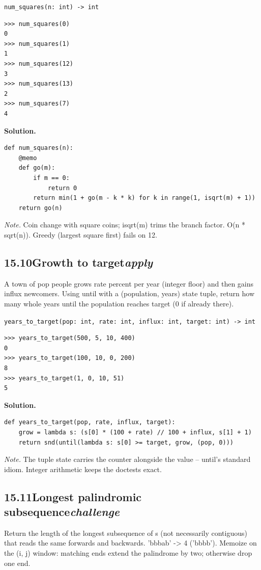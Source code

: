 \documentclass[10pt,letterpaper]{book}
\begin{document}
\noindent\texttt{num\_squares(n: int) -> int}
\begin{lstlisting}[style=ex]
>>> num_squares(0)
0
>>> num_squares(1)
1
>>> num_squares(12)
3
>>> num_squares(13)
2
>>> num_squares(7)
4
\end{lstlisting}
\noindent\textbf{Solution.}
\begin{lstlisting}[style=code]
def num_squares(n):
    @memo
    def go(m):
        if m == 0:
            return 0
        return min(1 + go(m - k * k) for k in range(1, isqrt(m) + 1))
    return go(n)
\end{lstlisting}
\noindent\textit{Note.} Coin change with square coins; isqrt(m) trims the branch factor. O(n * sqrt(n)). Greedy (largest square first) fails on 12.

\subsection*{15.10\quad Growth to target\hfill\textnormal{\textit{apply}}}
A town of pop people grows rate percent per year (integer floor) and then gains influx newcomers. Using until with a (population, years) state tuple, return how many whole years until the population reaches target (0 if already there).

\noindent\texttt{years\_to\_target(pop: int, rate: int, influx: int, target: int) -> int}
\begin{lstlisting}[style=ex]
>>> years_to_target(500, 5, 10, 400)
0
>>> years_to_target(100, 10, 0, 200)
8
>>> years_to_target(1, 0, 10, 51)
5
\end{lstlisting}
\noindent\textbf{Solution.}
\begin{lstlisting}[style=code]
def years_to_target(pop, rate, influx, target):
    grow = lambda s: (s[0] * (100 + rate) // 100 + influx, s[1] + 1)
    return snd(until(lambda s: s[0] >= target, grow, (pop, 0)))
\end{lstlisting}
\noindent\textit{Note.} The tuple state carries the counter alongside the value -- until's standard idiom. Integer arithmetic keeps the doctests exact.

\subsection*{15.11\quad Longest palindromic subsequence\hfill\textnormal{\textit{challenge}}}
Return the length of the longest subsequence of s (not necessarily contiguous) that reads the same forwards and backwards. 'bbbab' -> 4 ('bbbb'). Memoize on the (i, j) window: matching ends extend the palindrome by two; otherwise drop one end.
\end{document}
